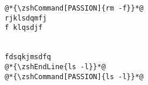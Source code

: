 \documentclass[12pt]{article}
\begin{document}
  \begin{tcolorbox} [
      colback=white, 
      colframe=black,
      boxrule=0.5pt,
      boxsep=0pt,
      left=2pt, 
      right=2pt, 
      top=-5pt, 
      bottom=0pt]
    \begin{lstlisting}
@*{\zshCommand[PASSION]{rm -f}}*@
rjklsdqmfj 
f klqsdjf 


fdsqkjmsdfq
@*{\zshEndLine{ls -l}}*@
@*{\zshCommand[PASSION]{ls -l}}*@
    \end{lstlisting}
  \end{tcolorbox}
\end{document}
